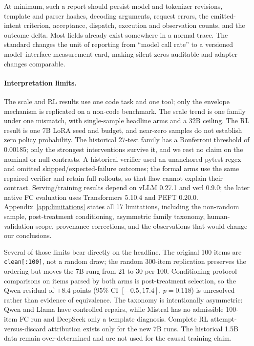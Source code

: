 At minimum, such a report should persist model and tokenizer revisions, template and parser
hashes, decoding arguments, request errors, the emitted-intent criterion, acceptance, dispatch,
execution and observation counts, and the outcome delta. Most fields already exist somewhere in a
normal trace. The standard changes the unit of reporting from ``model call rate'' to a versioned
model--interface measurement card, making silent zeros auditable and adapter changes comparable.

\paragraph{Interpretation limits.} The scale and RL results use one code task and one tool; only
the envelope mechanism is replicated on a non-code benchmark. The scale trend is one family under
one mismatch, with single-sample headline arms and a 32B ceiling. The RL result is one 7B LoRA seed
and budget, and near-zero samples do not establish zero policy probability. The historical 27-test family
has a Bonferroni threshold of 0.00185; only the strongest interventions survive it, and we
rest no claim on the nominal or null contrasts. A historical verifier used an unanchored pytest
regex and omitted skipped/expected-failure outcomes; the formal arms use the same repaired verifier
and retain full rollouts, so that flaw cannot explain their contrast. Serving/training results depend on vLLM 0.27.1
and verl 0.9.0; the later native FC evaluation uses Transformers 5.10.4 and PEFT 0.20.0.
Appendix~\ref{app:limitations} states all 17
limitations, including the non-random sample, post-treatment conditioning, asymmetric family
taxonomy, human-validation scope, provenance corrections, and the observations that would change
our conclusions.

Several of those limits bear directly on the headline. The original 100 items are
\texttt{clean[:100]}, not a random draw; the random 300-item replication preserves the ordering
but moves the 7B rung from 21 to 30 per 100. Conditioning protocol comparisons on items parsed by
both arms is post-treatment selection, so the Qwen residual of +8.4 points
($95\%$ CI $[-0.5,17.4]$, $p=0.118$) is unresolved rather than evidence of equivalence. The
taxonomy is intentionally asymmetric: Qwen and Llama have controlled repairs, while Mistral has
no admissible 100-item FC run and DeepSeek only a template diagnosis. Complete RL
attempt-versus-discard attribution exists only for the new 7B runs. The historical 1.5B data
remain over-determined and are not used for the causal training claim.

